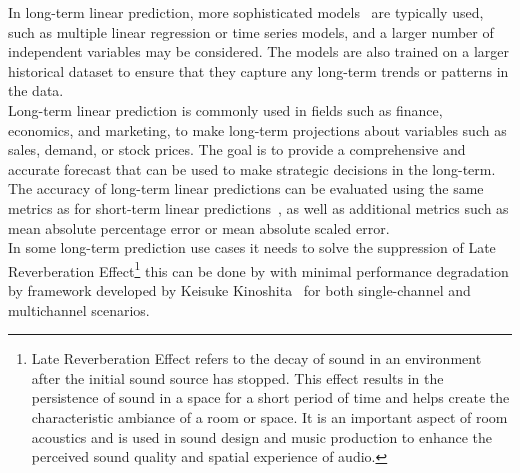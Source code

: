     In long-term linear prediction, more sophisticated models~\cite{Nave} are typically used, such as multiple linear regression or time series models,
    and a larger
    number of independent variables may be considered. The models are also trained on a larger historical dataset to ensure that they capture any
    long-term trends or patterns in the data.
    \\
    Long-term linear prediction is commonly used in fields such as finance, economics, and marketing, to make long-term projections about variables
    such as sales, demand, or stock prices. The goal is to provide a comprehensive and accurate forecast that can be used to make strategic
    decisions in the long-term. The accuracy of long-term linear predictions can be evaluated using the same metrics as for short-term linear
    predictions~\cite{Baker}, as well as additional metrics such as mean absolute percentage error or mean absolute scaled error.
    \\
    In some long-term prediction use cases it needs to solve the suppression of Late Reverberation Effect\footnote{Late Reverberation Effect
    refers to the decay of sound in an environment after the initial sound source has stopped. This effect results in the persistence of
    sound in a space for a short period of time and helps create the characteristic ambiance of a room or space.
    It is an important aspect of room acoustics and is used in sound design and music production to enhance the perceived sound
    quality and spatial experience of audio.} this can be done by with minimal performance degradation by framework developed by Keisuke
    Kinoshita~\cite{Kinoshita} for both single-channel and multichannel scenarios.

